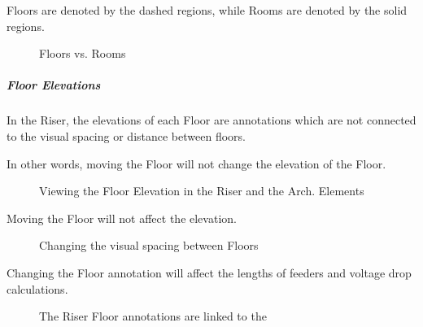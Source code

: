 \documentclass[letterpaper,10pt,english]{sphinxmanual}
\begin{document}
Floors are denoted by the dashed regions, while Rooms are denoted by the solid regions.

\begin{figure}[H]
\centering
\capstart

\noindent{}
\caption{Floors vs. Rooms}\label{\detokenize{docs/userguide/buildingelectricalmodel/riser/index-riser:id6}}\end{figure}


\subparagraph{Floor Elevations}
\label{\detokenize{docs/userguide/buildingelectricalmodel/riser/index-riser:floor-elevations}}\label{\detokenize{docs/userguide/buildingelectricalmodel/riser/index-riser:riser-floor-elevations}}
In the Riser, the elevations of each Floor are annotations which are not connected to the visual spacing or distance between floors.

In other words, moving the Floor will not change the elevation of the Floor.

\begin{figure}[H]
\centering
\capstart

\noindent{}
\caption{Viewing the Floor Elevation in the Riser and the Arch. Elements}\label{\detokenize{docs/userguide/buildingelectricalmodel/riser/index-riser:id7}}\end{figure}

Moving the Floor will not affect the elevation.

\begin{figure}[H]
\centering
\capstart

\noindent{}
\caption{Changing the visual spacing between Floors}\label{\detokenize{docs/userguide/buildingelectricalmodel/riser/index-riser:id8}}\end{figure}

Changing the Floor annotation will affect the lengths of feeders and voltage drop calculations.

\begin{figure}[H]
\centering
\capstart

\noindent{}
\caption{The Riser Floor annotations are linked to the {\hyperref[\detokenize{docs/userguide/definingarchitecturalelements/archelements/index-arch-elements:arch-elements}]{}}}\label{\detokenize{docs/userguide/buildingelectricalmodel/riser/index-riser:id9}}\end{figure}
\end{document}
